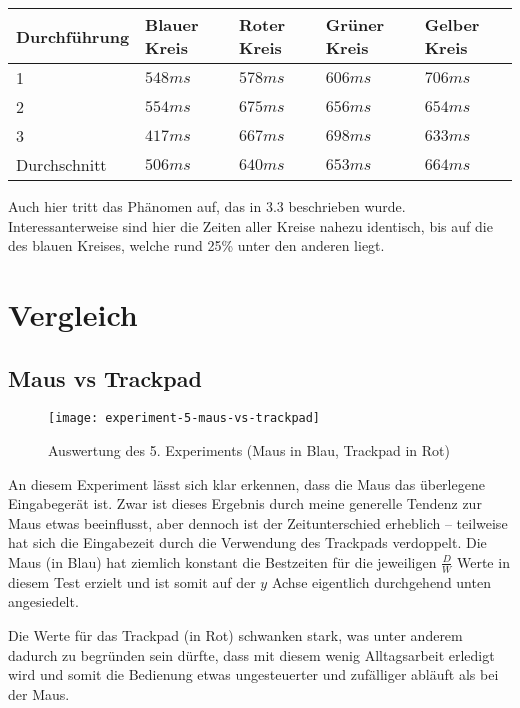 \documentclass{article}
\begin{document}
\begin{tabularx}{\textwidth}{|X|X|X|X|X|}
	\hline
	Durchführung & Blauer Kreis & Roter Kreis & Grüner Kreis & Gelber Kreis \\
	\hline
	1            & $548ms$      & $578ms$     & $606ms$      & $706ms$      \\
	\hline
	2            & $554ms$      & $675ms$     & $656ms$      & $654ms$      \\
	\hline
	3            & $417ms$      & $667ms$     & $698ms$      & $633ms$      \\
	\hline
	\hline
	Durchschnitt & $506ms$      & $640ms$     & $653ms$      & $664ms$      \\
	\hline
\end{tabularx}

\vspace{0.5em}

Auch hier tritt das Phänomen auf, das in 3.3 beschrieben wurde.
Interessanterweise sind hier die Zeiten aller Kreise nahezu identisch, bis auf
die des blauen Kreises, welche rund 25\% unter den anderen liegt.

\section{Vergleich}

\subsection{Maus vs Trackpad}

\begin{figure}[h!]
	\centering
	\texttt{[image: experiment-5-maus-vs-trackpad]}
	\caption{Auswertung des 5. Experiments (Maus in Blau, Trackpad in Rot)}
\end{figure}

An diesem Experiment lässt sich klar erkennen, dass die Maus das überlegene
Eingabegerät ist. Zwar ist dieses Ergebnis durch meine generelle Tendenz zur
Maus etwas beeinflusst, aber dennoch ist der Zeitunterschied erheblich –
teilweise hat sich die Eingabezeit durch die Verwendung des Trackpads
verdoppelt. Die Maus (in Blau) hat ziemlich konstant die Bestzeiten für die
jeweiligen $\frac{D}{W}$ Werte in diesem Test erzielt und ist somit auf der $y$
Achse eigentlich durchgehend unten angesiedelt.

Die Werte für das Trackpad (in Rot) schwanken stark, was unter anderem dadurch
zu begründen sein dürfte, dass mit diesem wenig Alltagsarbeit erledigt wird
und somit die Bedienung etwas ungesteuerter und zufälliger abläuft als bei der
Maus.
\end{document}
